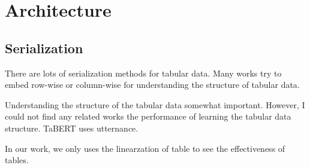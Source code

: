 \section{Architecture} 

\subsection{Serialization} 

There are lots of serialization methods for tabular data. Many works try to
embed row-wise or column-wise for understanding the structure of tabular data.

Understanding the structure of the tabular data somewhat important. However, I
could not find any related works the performance of learning the tabular data
structure. TaBERT uses utternance.

In our work, we only uses the linearzation of table to see the effectiveness of
tables.

